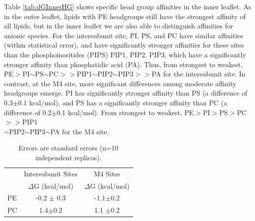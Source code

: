 Table \ref{tab:dGInnerHG} shows specific head group affinities in the inner leaflet. %
As in the outer leaflet, lipids with PE headgroups still have the strongest affinity of all lipids, but in the inner leaflet we are also able to distinguish affinities for anionic species. For the intersubunit site, PI, PS, and PC have similar affinities (within statistical error), and have significantly stronger affinities for these sites than the phosphoinositides (PIPS) PIP1, PIP2, PIP3, which have a significantly stronger affinity than phosphatidic acid  (PA). Thus, from strongest to weakest, PE$>$PI$\sim$PS$\sim$PC$>>$PIP1$\sim$PIP2$\sim$PIP3$>>$PA for the intersubunit site. In contrast, at the M4 site, more significant differences among moderate affinity headgroups emerge. PI has significantly stronger affinity than PS (a difference of 0.3$\pm$0.1 kcal/mol), and PS has a significantly stronger affinity than PC (a difference of 0.2$\pm$0.1 kcal/mol).%
From strongest to weakest, PE$>$PI$>$PS$>$PC$>>$PIP1\\$\sim$PIP2$\sim$PIP3$\sim$PA for the M4 site.    %



\begin{table}
	\caption[\Newaffinities () of neutral lipids for both sites in the outer leaflet, by head group.]{  Errors are standard errors (n=10 independent replicas). }
    \centering
    \begin{tabular}{|l||c|c|}
    \hline
	{} &   Intersubunit Sites&  M4 Sites\\
	{} & $\Delta$G (kcal/mol) & $\Delta$G (kcal/mol)\\
	\hline
	PE	&-0.2 $\pm$ 0.3& -1.1$\pm$0.2\\
	PC & 1.4$\pm$0.2&	1.1 $\pm$0.2\\
	\hline
    \end{tabular}
    \label{tab:dGOuterHG}
\end{table}

